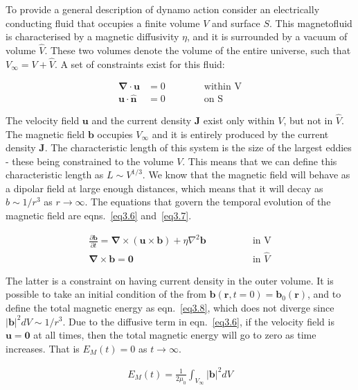 \documentclass[12pt,a4paper]{report}
\begin{document}
To provide a general description of dynamo action consider an electrically conducting fluid that occupies a finite volume $V$ and surface $S$. This magnetofluid is characterised by a magnetic diffusivity $\eta$, and it is surrounded by a vacuum of volume $\hat{V}$. These two volumes denote the volume of the entire universe, such that $V_\infty = V + \hat{V}$. A set of constraints exist for this fluid:

\begin{align}
 \bm \nabla \cdot \bm u &= 0 \qquad \qquad \text{within V} \nonumber\\
 \bm u \cdot \bm{\hat{n}} &= 0 \qquad \qquad \text{on S} \nonumber
\end{align}

The velocity field $\bm u$ and the current density $\bm J$ exist only within $V$, but not in $\hat{V}$. The magnetic field $\bm b$ occupies $V_\infty$ and it is entirely produced by the current density $\bm J$. The characteristic length of this system is the size of the largest eddies - these being constrained to the volume $V$. This means that we can define this characteristic length as $L \sim V^{1/3}$. We know that the magnetic field will behave as a dipolar field at large enough distances, which means that it will decay as $b \sim 1/r^3$ as $r \rightarrow \infty$. The equations that govern the temporal evolution of the magnetic field are eqns.~\ref{eq3.6} and~\ref{eq3.7}.

\begin{align}
 \frac{\partial \bm b}{\partial t} = \bm \nabla \times (\bm u \times \bm b) + \eta \nabla^2 \bm b \qquad \qquad &\text{in V}
 \label{eq3.6} \\
 \bm \nabla \times \bm b = \bm 0 \qquad \qquad &\text{in $\hat{V}$} \label{eq3.7}
\end{align}

The latter is a constraint on having current density in the outer volume. It is possible to take an initial condition of the from $\bm b(\bm r, t=0) = \bm b_0(\bm r)$, and to define the total magnetic energy as eqn.~\ref{eq3.8}, which does not diverge since $\vert \bm b \vert^2 dV \sim 1/r^3$. Due to the diffusive term in eqn.~\ref{eq3.6}, if the velocity field is $\bm u = \bm 0$ at all times, then the total magnetic energy will go to zero as time increases. That is $E_M(t) = 0$ as $t \rightarrow \infty$.

\begin{align}
 E_M(t) = \frac{1}{2 \mu_0} \int_{V_\infty} \vert \bm b \vert^2 dV
 \label{eq3.8}
\end{align}
\end{document}
